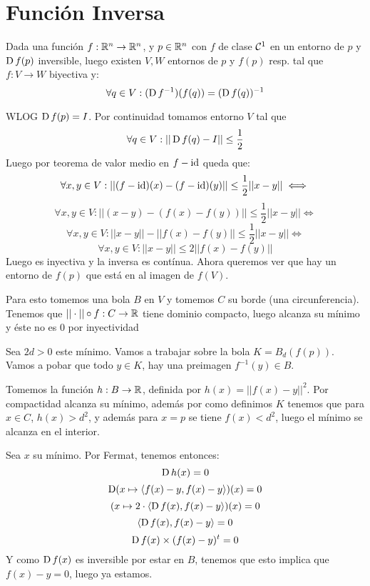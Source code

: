 \documentclass{article}
\begin{document}
    \section*{Función Inversa}
    \begin{teo}
        Dada una función $f : \mathbb{R}^n \to \mathbb{R}^n$, y $p \in \mathbb{R}^n$ con $f$ de clase $\mathcal{C}^1$ en un entorno de $p$ y $\operatorname{D} f(p)$ inversible, luego existen $V, W$ entornos de $p$ y $f(p)$ resp. tal que $f : V \to W$ biyectiva y:
        \[
            \forall q \in V : (\operatorname{D} f^{-1})(f(q)) = (\operatorname{D} f(q))^{-1}
        \]
    \end{teo}
    \begin{demo}
        WLOG $\operatorname{D} f(p) = I$. Por continuidad tomamos entorno $V$ tal que
        \[\forall q \in V : ||\operatorname{D} f(q) - I|| \leq \frac{1}{2}\]
        Luego por teorema de valor medio en $f - \operatorname{id}$ queda que:
        \[\forall x, y \in V : ||(f - \operatorname{id})(x) - (f - \operatorname{id})(y)|| \leq \frac{1}{2}||x-y||\iff\]
        \[\forall x, y \in V : ||(x - y) - (f(x) - f(y))|| \leq \frac{1}{2}||x-y||\iff\]
        \[\forall x, y \in V : ||x - y|| - ||f(x) - f(y)|| \leq \frac{1}{2}||x-y||\iff\]
        \[\forall x, y \in V : ||x - y|| \leq 2||f(x) - f(y)||\]
        Luego es inyectiva y la inversa es contínua.
        Ahora queremos ver que hay un entorno de $f(p)$ que está en al imagen de $f(V)$.

        Para esto tomemos una bola $B$ en $V$ y tomemos $C$ su borde (una circunferencia). Tenemos que $||\cdot|| \circ f : C \to \mathbb{R}$ tiene dominio compacto, luego alcanza su mínimo y éste no es $0$ por inyectividad

        Sea $2d > 0$ este mínimo. Vamos a trabajar sobre la bola $K = B_d(f(p))$. Vamos a pobar que todo $y \in K$, hay una preimagen $f^{-1}(y) \in B$.

        Tomemos la función $h : B \to \mathbb{R}$, definida por $h(x) = ||f(x) - y||^2$. Por compactidad alcanza su mínimo, además por como definimos $K$ tenemos que para $x \in C$, $h(x) > d^2$, y además para $x = p$ se tiene $f(x) < d^2$, luego el mínimo se alcanza en el interior.

        Sea $x$ su mínimo. Por Fermat, tenemos entonces:
        \[
            \operatorname{D} h(x) = 0
        \]
        \[
            \operatorname{D} (x \mapsto \langle f(x) - y, f(x) - y \rangle)(x) = 0
        \]
        \[
            (x \mapsto 2 \cdot \langle \operatorname{D} f(x), f(x) - y \rangle)(x) = 0
        \]
        \[
            \langle \operatorname{D} f(x), f(x) - y \rangle = 0
        \]
        \[
            \operatorname{D} f(x) \times (f(x) - y)^t = 0
        \]
        Y como $\operatorname{D} f(x)$ es inversible por estar en $B$, tenemos que esto implica que $f(x) - y = 0$, luego ya estamos.
    \end{demo}
\end{document}
